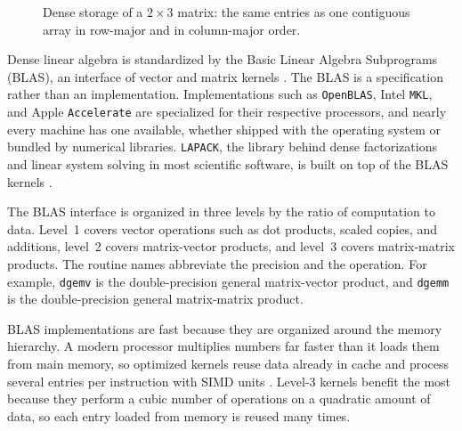 \begin{figure}[htbp]
\centering
{}
\caption{Dense storage of a $2 \times 3$ matrix: the same entries as one contiguous array in
row-major and in column-major order.}
\label{fig:dense-storage}
\end{figure}

Dense linear algebra is standardized by the Basic Linear Algebra Subprograms (BLAS), an
interface of vector and matrix kernels \cite{lawson1979blas, dongarra1990level3}.
The BLAS is a specification rather than an implementation.
Implementations such as \texttt{OpenBLAS}, Intel \texttt{MKL}, and Apple \texttt{Accelerate}
are specialized for their respective processors, and nearly every machine has one available,
whether shipped with the operating system or bundled by numerical libraries.
\texttt{LAPACK}, the library behind dense factorizations and linear system solving in most
scientific software, is built on top of the BLAS kernels \cite{anderson1999lapack}.

The BLAS interface is organized in three levels by the ratio of computation to data.
Level~1 covers vector operations such as dot products, scaled copies, and additions, level~2
covers matrix-vector products, and level~3 covers matrix-matrix products.
The routine names abbreviate the precision and the operation.
For example, \texttt{dgemv} is the double-precision general matrix-vector product, and
\texttt{dgemm} is the double-precision general matrix-matrix product.

BLAS implementations are fast because they are organized around the memory hierarchy.
A modern processor multiplies numbers far faster than it loads them from main memory, so
optimized kernels reuse data already in cache and process several entries per instruction
with \ac{SIMD} units \cite{goto2008anatomy}.
Level-3 kernels benefit the most because they perform a cubic number of operations on a
quadratic amount of data, so each entry loaded from memory is reused many times.

